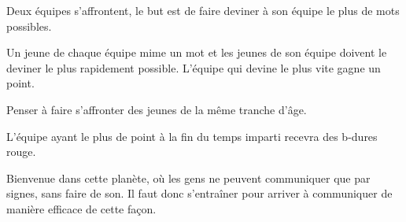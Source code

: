 \documentclass{grand-jeu}
\begin{document}
\begin{liste-materiel}
\end{liste-materiel}

\begin{regles}
Deux équipes s'affrontent, le but est de faire deviner à son équipe le plus de mots possibles. 

Un jeune de chaque équipe mime un mot et les jeunes de son équipe doivent le deviner le plus rapidement possible. L'équipe qui devine le plus vite gagne un point. 

Penser à faire s'affronter des jeunes de la même tranche d'âge. 

L’équipe ayant le plus de point à la fin du temps imparti recevra des b-dures rouge.
\end{regles}

\begin{imaginaire}
Bienvenue dans cette planète, où les gens ne peuvent communiquer que par signes, sans faire de son. Il faut donc s'entraîner pour arriver à communiquer de manière efficace de cette façon.

\end{imaginaire}

\begin{moments-stop}
\end{moments-stop}
\end{document}
